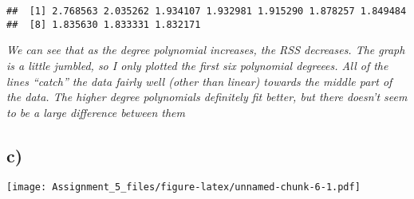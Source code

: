 \documentclass[]{article}
\newenvironment{Shaded}{\begin{snugshade}}{\end{snugshade}}
\newcommand{\KeywordTok}[1]{\textcolor[rgb]{0.13,0.29,0.53}{\textbf{#1}}}
\newcommand{\DataTypeTok}[1]{\textcolor[rgb]{0.13,0.29,0.53}{#1}}
\newcommand{\DecValTok}[1]{\textcolor[rgb]{0.00,0.00,0.81}{#1}}
\newcommand{\StringTok}[1]{\textcolor[rgb]{0.31,0.60,0.02}{#1}}
\newcommand{\OtherTok}[1]{\textcolor[rgb]{0.56,0.35,0.01}{#1}}
\newcommand{\ControlFlowTok}[1]{\textcolor[rgb]{0.13,0.29,0.53}{\textbf{#1}}}
\newcommand{\OperatorTok}[1]{\textcolor[rgb]{0.81,0.36,0.00}{\textbf{#1}}}
\newcommand{\NormalTok}[1]{#1}
\begin{document}
\begin{verbatim}
##  [1] 2.768563 2.035262 1.934107 1.932981 1.915290 1.878257 1.849484
##  [8] 1.835630 1.833331 1.832171
\end{verbatim}

\emph{We can see that as the degree polynomial increases, the RSS
decreases. The graph is a little jumbled, so I only plotted the first
six polynomial degreees. All of the lines ``catch'' the data fairly well
(other than linear) towards the middle part of the data. The higher
degree polynomials definitely fit better, but there doesn't seem to be a
large difference between them}

\subsection{c)}\label{c}

\begin{Shaded}
\end{Shaded}

\texttt{[image: Assignment\_5\_files/figure-latex/unnamed-chunk-6-1.pdf]}
\end{document}
